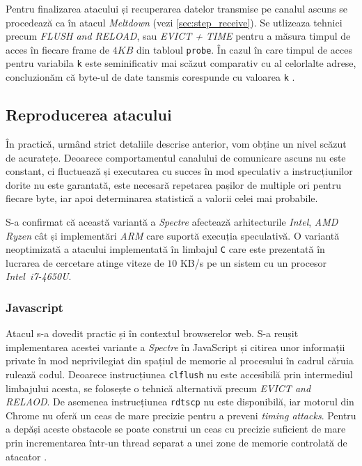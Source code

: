 Pentru finalizarea atacului și recuperarea datelor transmise pe canalul ascuns
se procedează ca în atacul \emph{Meltdown} (vezi \ref{sec:step_receive}). Se
utlizeaza tehnici precum \emph{FLUSH and RELOAD}, sau \emph{EVICT + TIME}
pentru a măsura timpul de acces în fiecare frame de $4KB$ din tabloul
\texttt{probe}. În cazul în care timpul de acces pentru variabila \texttt{k}
este seminificativ mai scăzut comparativ cu al celorlalte adrese, concluzionăm
că byte-ul de date tansmis corespunde cu valoarea \texttt{k} \cite{spectre2019}.

\subsection{Reproducerea atacului}

În practică, urmând strict detaliile descrise anterior, vom obține un nivel
scăzut de acuratețe. Deoarece comportamentul canalului de comunicare ascuns nu
este constant, ci fluctuează și executarea cu succes în mod speculativ a
instrucțiunilor dorite nu este garantată, este necesară repetarea pașilor de
multiple ori pentru fiecare byte, iar apoi determinarea statistică a valorii
celei mai probabile. 

S-a confirmat că această variantă a \emph{Spectre} afectează arhitecturile
\emph{Intel}, \emph{AMD Ryzen} cât și implementări \emph{ARM} care suportă
execuția speculativă. O variantă neoptimizată a atacului implementată în
limbajul \texttt{C} care este prezentată în lucrarea de cercetare
\cite{spectre2019} atinge viteze de $10$ KB/s pe un sistem cu un procesor
\emph{Intel\ i7-4650U}.

\subsubsection{Javascript}

Atacul s-a dovedit practic și în contextul browserelor web. S-a reușit
implementarea acestei variante a \emph{Spectre} în JavaScript și citirea unor
informații private în mod neprivilegiat din spațiul de memorie al procesului în
cadrul căruia rulează codul. Deoarece instrucțiunea \texttt{clflush} nu este
accesibilă prin intermediul limbajului acesta, se folosește o tehnică
alternativă precum \emph{EVICT and RELAOD}. De asemenea instrucțiunea
\texttt{rdtscp} nu este disponibilă, iar motorul din Chrome nu oferă un ceas de
mare precizie pentru a preveni \emph{timing attacks}. Pentru a depăși aceste
obstacole se poate construi un ceas cu precizie suficient de mare prin
incrementarea într-un thread separat a unei zone de memorie controlată de
atacator \cite{spectre2019}.

